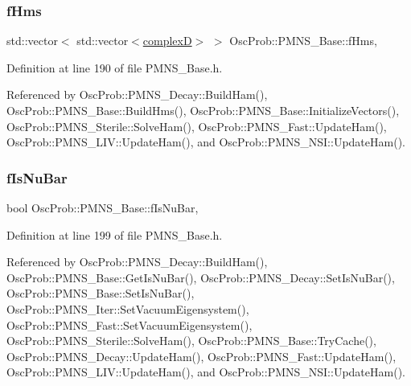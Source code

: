 \subsubsection{\texorpdfstring{f\+Hms}{fHms}}
{\footnotesize\ttfamily std\+::vector$<$ std\+::vector$<$\hyperlink{EigenPoint_8h_a67ca8e107e20610c3fff78d5e726ece0}{complexD}$>$ $>$ Osc\+Prob\+::\+P\+M\+N\+S\+\_\+\+Base\+::f\+Hms\hspace{0.3cm}{\ttfamily [protected]}, {\ttfamily [inherited]}}



Definition at line 190 of file P\+M\+N\+S\+\_\+\+Base.\+h.



Referenced by Osc\+Prob\+::\+P\+M\+N\+S\+\_\+\+Decay\+::\+Build\+Ham(), Osc\+Prob\+::\+P\+M\+N\+S\+\_\+\+Base\+::\+Build\+Hms(), Osc\+Prob\+::\+P\+M\+N\+S\+\_\+\+Base\+::\+Initialize\+Vectors(), Osc\+Prob\+::\+P\+M\+N\+S\+\_\+\+Sterile\+::\+Solve\+Ham(), Osc\+Prob\+::\+P\+M\+N\+S\+\_\+\+Fast\+::\+Update\+Ham(), Osc\+Prob\+::\+P\+M\+N\+S\+\_\+\+L\+I\+V\+::\+Update\+Ham(), and Osc\+Prob\+::\+P\+M\+N\+S\+\_\+\+N\+S\+I\+::\+Update\+Ham().

\mbox{\label{classOscProb_1_1PMNS__Base_a0ebaeaefab36a3ff381c6293faedfdd6}} 
\subsubsection{\texorpdfstring{f\+Is\+Nu\+Bar}{fIsNuBar}}
{\footnotesize\ttfamily bool Osc\+Prob\+::\+P\+M\+N\+S\+\_\+\+Base\+::f\+Is\+Nu\+Bar\hspace{0.3cm}{\ttfamily [protected]}, {\ttfamily [inherited]}}



Definition at line 199 of file P\+M\+N\+S\+\_\+\+Base.\+h.



Referenced by Osc\+Prob\+::\+P\+M\+N\+S\+\_\+\+Decay\+::\+Build\+Ham(), Osc\+Prob\+::\+P\+M\+N\+S\+\_\+\+Base\+::\+Get\+Is\+Nu\+Bar(), Osc\+Prob\+::\+P\+M\+N\+S\+\_\+\+Decay\+::\+Set\+Is\+Nu\+Bar(), Osc\+Prob\+::\+P\+M\+N\+S\+\_\+\+Base\+::\+Set\+Is\+Nu\+Bar(), Osc\+Prob\+::\+P\+M\+N\+S\+\_\+\+Iter\+::\+Set\+Vacuum\+Eigensystem(), Osc\+Prob\+::\+P\+M\+N\+S\+\_\+\+Fast\+::\+Set\+Vacuum\+Eigensystem(), Osc\+Prob\+::\+P\+M\+N\+S\+\_\+\+Sterile\+::\+Solve\+Ham(), Osc\+Prob\+::\+P\+M\+N\+S\+\_\+\+Base\+::\+Try\+Cache(), Osc\+Prob\+::\+P\+M\+N\+S\+\_\+\+Decay\+::\+Update\+Ham(), Osc\+Prob\+::\+P\+M\+N\+S\+\_\+\+Fast\+::\+Update\+Ham(), Osc\+Prob\+::\+P\+M\+N\+S\+\_\+\+L\+I\+V\+::\+Update\+Ham(), and Osc\+Prob\+::\+P\+M\+N\+S\+\_\+\+N\+S\+I\+::\+Update\+Ham().


